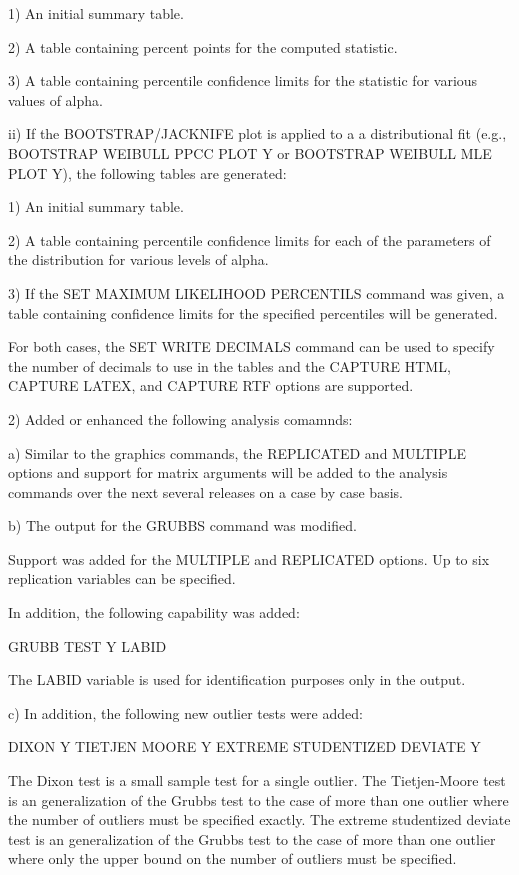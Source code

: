{           1) An initial summary table.

           2) A table containing percent points for the computed
              statistic.

           3) A table containing percentile confidence limits for
              the statistic for various values of alpha.

       ii) If the BOOTSTRAP/JACKNIFE plot is applied to a
           a distributional fit (e.g., BOOTSTRAP WEIBULL PPCC PLOT Y
           or BOOTSTRAP WEIBULL MLE PLOT Y), the following tables are
           generated:

           1) An initial summary table.

           2) A table containing percentile confidence limits for
              each of the parameters of the distribution for various
              levels of alpha.

           3) If the SET MAXIMUM LIKELIHOOD PERCENTILS command was
              given, a table containing confidence limits for the
              specified percentiles will be generated.

       For both cases, the SET WRITE DECIMALS command can be
       used to specify the number of decimals to use in the
       tables and the CAPTURE HTML, CAPTURE LATEX, and
       CAPTURE RTF options are supported.

 2) Added or enhanced the following analysis comamnds:

    a) Similar to the graphics commands, the REPLICATED and MULTIPLE
       options and support for matrix arguments will be added to the
       analysis commands over the next several releases on a case by
       case basis.

    b) The output for the GRUBBS command was modified.

       Support was added for the MULTIPLE and REPLICATED options.
       Up to six replication variables can be specified.

       In addition, the following capability was added:

           GRUBB TEST Y LABID

       The LABID variable is used for identification purposes
       only in the output.

    c) In addition, the following new outlier tests were added:

           DIXON Y
           TIETJEN MOORE Y
           EXTREME STUDENTIZED DEVIATE Y

       The Dixon test is a small sample test for a single outlier.
       The Tietjen-Moore test is an generalization of the Grubbs
       test to the case of more than one outlier where the number
       of outliers must be specified exactly.  The extreme studentized
       deviate test is an generalization of the Grubbs test to the
       case of more than one outlier where only the upper bound on
       the number of outliers must be specified.

}
